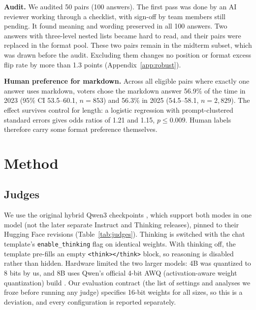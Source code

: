 \documentclass[10pt]{article}
\begin{document}
\textbf{Audit.} We audited 50 pairs (100 answers). The first pass was done by an AI reviewer working through a
checklist, with sign-off by team members still pending. It found meaning and wording preserved in all 100 answers.
Two answers with three-level nested lists became hard to read, and their pairs were replaced in the format pool.
These two pairs remain in the midterm subset, which was drawn before the audit. Excluding them changes no position or
format excess flip rate by more than 1.3 points (Appendix~\ref{app:robust}).

\textbf{Human preference for markdown.} Across all eligible pairs where exactly one answer uses markdown, voters
chose the markdown answer 56.9\% of the time in 2023 (95\% CI 53.5--60.1, $n=853$) and 56.3\% in 2025
(54.5--58.1, $n=2{,}829$). The effect survives control for length: a logistic regression with prompt-clustered
standard errors gives odds ratios of 1.21 and 1.15, $p \leq 0.009$. Human labels therefore carry some format
preference themselves.

\section{Method}
\subsection{Judges}
We use the original hybrid Qwen3 checkpoints \citep{qwen2025qwen3}, which support both modes in one model
(not the later separate Instruct and Thinking releases), pinned to their Hugging Face
revisions (Table~\ref{tab:judges}). Thinking is switched with the chat template's \texttt{enable\_thinking}
flag on identical weights. With thinking off, the template pre-fills an empty \texttt{<think></think>} block, so
reasoning is disabled rather than hidden. Hardware limited the two larger models: 4B was quantized to 8 bits by
us, and 8B uses Qwen's official 4-bit AWQ (activation-aware weight quantization) build \citep{lin2024awq}. Our evaluation contract (the list of settings and analyses we froze before running any
judge) specifies 16-bit weights for all sizes, so this is a deviation, and every configuration is reported separately.
\end{document}
